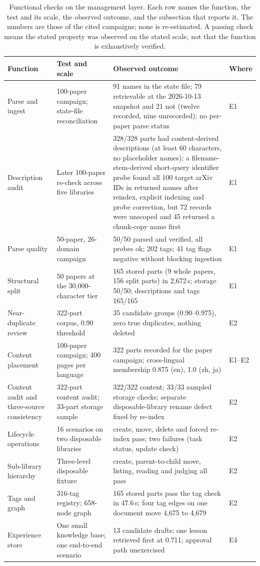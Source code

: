\documentclass[11pt]{article}
\begin{document}
\begin{table}
\centering
\footnotesize
\setlength{\tabcolsep}{4pt}
\caption{Functional checks on the management layer. Each row names the
function, the test and its scale, the observed outcome, and the subsection
that reports it. The numbers are those of the cited campaigns; none is
re-estimated. A passing check means the stated property was observed on the
stated scale, not that the function is exhaustively verified.}

\begin{tabular}{@{}p{4cm}p{4cm}p{4cm}p{4cm}@{}}
\toprule
Function & Test and scale & Observed outcome & Where\\
\midrule
Parse and ingest & 100-paper campaign; state-file reconciliation & 91 names in the state file; 79 retrievable at the 2026-10-13 snapshot and 21 not (twelve recorded, nine unrecorded); no per-paper parse status & E1\\
Description audit & Later 100-paper re-check across five libraries & 328/328 parts had content-derived descriptions (at least 60 characters, no placeholder names); a filename-stem-derived short-query identifier probe found all 100 target arXiv IDs in returned names after reindex, explicit indexing and probe correction, but 72 records were unscoped and 45 returned a chunk-copy name first & E1\\
Parse quality & 50-paper, 26-domain campaign & 50/50 parsed and verified, all probes ok; 202 tags; 41 tag flags negative without blocking ingestion & E1\\
Structural split & 50 papers at the 30{,}000-character tier & 165 stored parts (9 whole papers, 156 split parts) in 2{,}672\,s; storage 50/50; descriptions and tags 165/165 & E1\\
Near-duplicate review & 322-part corpus, 0.90 threshold & 35 candidate groups (0.90--0.975), zero true duplicates, nothing deleted & E2\\
Content placement & 100-paper campaign; 400 pages per language & 322 parts recorded for the paper campaign; cross-lingual membership 0.875 (en), 1.0 (zh, ja) & E1--E2\\
Content audit and three-source consistency & 322-part content audit; 33-part storage sample & 322/322 content; 33/33 sampled storage checks; separate disposable-library rename defect fixed by re-index & E2\\
Lifecycle operations & 16 scenarios on two disposable libraries & create, move, delete and forced re-index pass; two failures (task status, update check) & E2\\
Sub-library hierarchy & Three-level disposable fixture & create, parent-to-child move, listing, reading and judging all pass & E2\\
Tags and graph & 316-tag registry; 658-node graph & 165 stored parts pass the tag check in 47.6\,s; four tag edges on one document move 4{,}675 to 4{,}679 & E2\\
Experience store & One small knowledge base; one end-to-end scenario & 13 candidate drafts; one lesson retrieved first at 0.711; approval path unexercised & E4\\
\bottomrule
\end{tabular}
\end{table}
\end{document}
